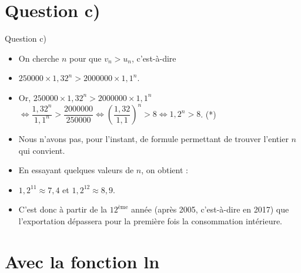 
\section{Question c)}

\begin{frame}{Question c)}

\begin{itemize}
 	
	\item On cherche $n$ pour que $v_n > u_n$, c'est-à-dire
		
	\item $250 000 \times 1,32^n > 2 000 000 \times 1,1^n$.
		
	\item Or, $250 000 \times 1,32^n > 2 000 000 \times 1,1^n$\\ $\Leftrightarrow \dfrac{1,32^n}{1,1^n} > \dfrac{2 000 000}{250 000} \Leftrightarrow \left( \dfrac{1,32}{1,1}\right)^n > 8 \Leftrightarrow 1,2^n > 8$. (*)
	
	\item Nous n'avons pas, pour l'instant, de formule permettant de trouver l'entier $n$ qui convient.
	
	\item En essayant quelques valeurs de $n$, on obtient :
	
	\item $1,2^{11} \approx 7,4$ et $1,2^{12} \approx 8,9$.
	
	\item C'est donc à partir de la $12^{\text{ème}}$ année (après 2005, c'est-à-dire en 2017) que l'exportation dépassera pour la première fois la consommation intérieure.
	
	\end{itemize}
\end{frame}



\section{Avec la fonction ln}



